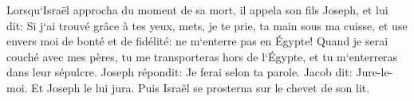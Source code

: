 \verse Lorsqu`Israël approcha du moment de sa mort, il appela son fils Joseph, et lui dit: Si j`ai trouvé grâce à tes yeux, mets, je te prie, ta main sous ma cuisse, et use envers moi de bonté et de fidélité: ne m`enterre pas en Égypte! 
\verse Quand je serai couché avec mes pères, tu me transporteras hors de l`Égypte, et tu m`enterreras dans leur sépulcre. Joseph répondit: Je ferai selon ta parole. 
\verse Jacob dit: Jure-le-moi. Et Joseph le lui jura. Puis Israël se prosterna sur le chevet de son lit. 

\chapter{}


